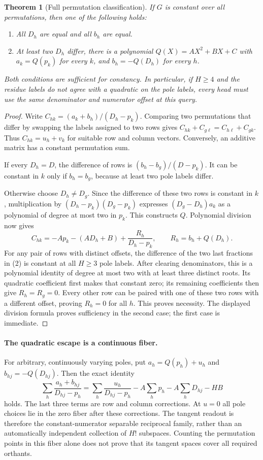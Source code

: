 \documentclass[11pt]{article}
\newtheorem{theorem}{Theorem}
\begin{document}
\begin{theorem}[Full permutation classification]
If $G$ is constant over all permutations, then one of the following
holds:
\begin{enumerate}
\item All $D_h$ are equal and all $b_h$ are equal.
\item At least two $D_h$ differ, there is a polynomial
$Q(X)=AX^2+BX+C$ with $a_k=Q(p_k)$ for every $k$, and
$b_h=-Q(D_h)$ for every $h$.
\end{enumerate}
Both conditions are sufficient for constancy. In particular, if
$H\geq4$ and the residue labels do not agree with a quadratic on the
pole labels, every head must use the same denominator and numerator
offset at this query.
\end{theorem}
\begin{proof}
Write $C_{hk}=(a_k+b_h)/(D_h-p_k)$. Comparing two permutations that
differ by swapping the labels assigned to two rows gives
$C_{hk}+C_{g\ell}=C_{h\ell}+C_{gk}$. Thus
$C_{hk}=u_h+v_k$ for suitable row and column vectors. Conversely, an
additive matrix has a constant permutation sum.

If every $D_h=D$, the difference of rows is
$(b_h-b_g)/(D-p_k)$. It can be constant in $k$ only if $b_h=b_g$,
because at least two pole labels differ.

Otherwise choose $D_h\ne D_g$. Since the difference of these two
rows is constant in $k$, multiplication by
$(D_h-p_k)(D_g-p_k)$ expresses $(D_g-D_h)a_k$ as a polynomial of
degree at most two in $p_k$. This constructs $Q$.
Polynomial division now gives
\[
 C_{hk}=-Ap_k-(AD_h+B)+\frac{R_h}{D_h-p_k},
 \qquad R_h=b_h+Q(D_h).
 \tag{2}
\]
For any pair of rows with distinct offsets, the difference of the two
last fractions in (2) is constant at all $H\geq3$ pole labels.
After clearing denominators, this is a polynomial identity of degree
at most two with at least three distinct roots. Its quadratic
coefficient first makes that constant zero; its remaining coefficients
then give $R_h=R_g=0$. Every other row can be paired with one of
these two rows with a different offset, proving $R_h=0$ for all $h$.
This proves necessity. The displayed division formula proves
sufficiency in the second case; the first case is immediate.
\end{proof}

\paragraph{The quadratic escape is a continuous fiber.}
For arbitrary, continuously varying poles, put
$a_h=Q(p_h)+u_h$ and $b_{hj}=-Q(D_{hj})$. Then the exact identity
\[
 \sum_h\frac{a_h+b_{hj}}{D_{hj}-p_h}
 =\sum_h\frac{u_h}{D_{hj}-p_h}
   -A\sum_h p_h-A\sum_hD_{hj}-HB
 \tag{3}
\]
holds. The last three terms are row and column corrections. At $u=0$
all pole choices lie in the zero fiber after these corrections.
The tangent readout is therefore the constant-numerator separable
reciprocal family, rather than an automatically independent collection
of $H!$ subspaces. Counting the permutation points in this fiber alone
does not prove that its tangent spaces cover all required orthants.
\end{document}
